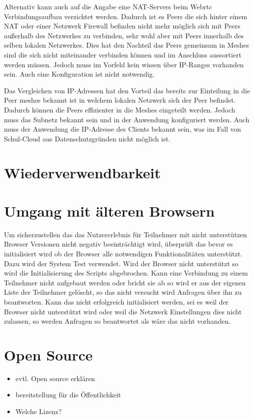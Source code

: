 Alternativ kann auch auf die Angabe eine NAT-Servers beim Webrtc Verbindungsaufbau verzichtet werden. Dadurch ist es Peers die sich hinter einem NAT oder einer Netzwerk Firewall befinden nicht mehr möglich sich mit Peers außerhalb des Netzwerkes zu verbinden, sehr wohl aber mit Peers innerhalb des selben lokalen Netzwerkes. Dies hat den Nachteil das Peers gemeinsam in Meshes sind die sich nicht miteinander verbinden können und im Anschluss aussortiert werden müssen. Jedoch muss im Vorfeld kein wissen über IP-Ranges vorhanden sein. Auch eine Konfiguration ist nicht notwendig. 

Das Vergleichen von IP-Adressen hat den Vorteil das bereits zur Einteilung in die Peer meshes bekannt ist in welchem lokalen Netzwerk sich der Peer befindet. Dadurch können die Peers effizienter in die Meshes eingeteilt werden. Jedoch muss das Subnetz bekannt sein und in der Anwendung konfiguriert werden. Auch muss der Anwendung die IP-Adresse des Clients bekannt sein, was im Fall von Schul-Cloud aus Datenschutzgründen nicht möglich ist.

\section{Wiederverwendbarkeit}
\section{Umgang mit älteren Browsern}
Um sicherzustellen das das Nutzererlebnis für Teilnehmer mit nicht unterstützen Browser Versionen nicht negativ beeinträchtigt wird, überprüft das \cdn bevor es initialisiert wird ob der Browser alle notwendigen Funktionalitäten unterstützt. Dazu wird der System Test verwendet. Wird der Browser nicht unterstützt so wird die Initialisierung des Scripts abgebrochen. 
Kann eine Verbindung zu einem Teilnehmer nicht aufgebaut werden oder bricht sie ab so wird er aus der eigenen Liste der Teilnehmer gelöscht, so das nicht versucht wird Anfragen über ihn zu beantworten. 
Kann das \cdn nicht erfolgreich initialisiert werden, sei es weil der Browser nicht unterstützt wird oder weil die Netzwerk Einstellungen dies nicht zulassen, so werden Anfragen so beantwortet als wäre das \cdn nicht vorhanden.

\section{Open Source}
\begin{itemize}
	\item evtl. Open source erklären
	\item bereitstellung für die Öffentlichkeit
	\item Welche Lizenz?
\end{itemize}
%

